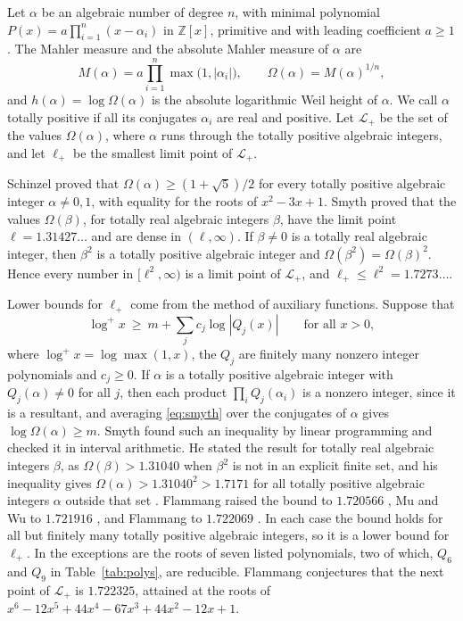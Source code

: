 \documentclass[11pt]{amsart}
\theoremstyle{remark}
\numberwithin{equation}{section}
\newcommand{\Z}{\mathbb{Z}}
\newcommand{\logp}{\log^{+}}
\newcommand{\SmyVal}{1.7171}
\newcommand{\FlamNinetySix}{1.720566}
\newcommand{\MuWuVal}{1.721916}
\newcommand{\FlamVal}{1.722069}
\newcommand{\SmyEll}{1.31427}
\newcommand{\SmyEllSq}{1.7273}
\begin{document}
Let $\alpha$ be an algebraic number of degree $n$, with minimal polynomial $P(x)=a\prod_{i=1}^n(x-\alpha_i)$ in $\Z[x]$, primitive and with leading coefficient $a\ge1$. The Mahler measure and the absolute Mahler measure of $\alpha$ are
\[
M(\alpha)=a\prod_{i=1}^n\max\bigl(1,|\alpha_i|\bigr),\qquad \Omega(\alpha)=M(\alpha)^{1/n},
\]
and $h(\alpha)=\log\Omega(\alpha)$ is the absolute logarithmic Weil height of $\alpha$. We call $\alpha$ totally positive if all its conjugates $\alpha_i$ are real and positive. Let $\mathcal L_+$ be the set of the values $\Omega(\alpha)$, where $\alpha$ runs through the totally positive algebraic integers, and let $\ell_+$ be the smallest limit point of $\mathcal L_+$.

Schinzel \cite{Sch73} proved that $\Omega(\alpha)\ge(1+\sqrt5)/2$ for every totally positive algebraic integer $\alpha\ne0,1$, with equality for the roots of $x^2-3x+1$. Smyth \cite[Theorems~1 and~2]{Smy80} proved that the values $\Omega(\beta)$, for totally real algebraic integers $\beta$, have the limit point $\ell=\SmyEll\ldots$ and are dense in $(\ell,\infty)$. If $\beta\ne0$ is a totally real algebraic integer, then $\beta^2$ is a totally positive algebraic integer and $\Omega(\beta^2)=\Omega(\beta)^2$. Hence every number in $[\ell^2,\infty)$ is a limit point of $\mathcal L_+$, and $\ell_+\le\ell^2=\SmyEllSq\ldots$.

Lower bounds for $\ell_+$ come from the method of auxiliary functions. Suppose that
\begin{equation}\label{eq:smyth}
\logp x\ \ge\ m+\sum_{j}c_j\log|Q_j(x)|\qquad\text{for all }x>0,
\end{equation}
where $\logp x=\log\max(1,x)$, the $Q_j$ are finitely many nonzero integer polynomials and $c_j\ge0$. If $\alpha$ is a totally positive algebraic integer with $Q_j(\alpha)\ne0$ for all $j$, then each product $\prod_iQ_j(\alpha_i)$ is a nonzero integer, since it is a resultant, and averaging \eqref{eq:smyth} over the conjugates of $\alpha$ gives $\log\Omega(\alpha)\ge m$. Smyth \cite{Smy81} found such an inequality by linear programming and checked it in interval arithmetic. He stated the result for totally real algebraic integers $\beta$, as $\Omega(\beta)>1.31040$ when $\beta^2$ is not in an explicit finite set, and his inequality gives $\Omega(\alpha)>1.31040^2>\SmyVal$ for all totally positive algebraic integers $\alpha$ outside that set \cite[(6) and (9)]{Smy81}. Flammang raised the bound to $\FlamNinetySix$ \cite{Fla96}, Mu and Wu to $\MuWuVal$ \cite{MW13}, and Flammang to $\FlamVal$ \cite[Theorem~1]{Fla15}. In each case the bound holds for all but finitely many totally positive algebraic integers, so it is a lower bound for $\ell_+$. In \cite{Fla15} the exceptions are the roots of seven listed polynomials, two of which, $Q_6$ and $Q_9$ in Table~\ref{tab:polys}, are reducible. Flammang conjectures that the next point of $\mathcal L_+$ is $1.722325$, attained at the roots of $x^6-12x^5+44x^4-67x^3+44x^2-12x+1$.
\end{document}
